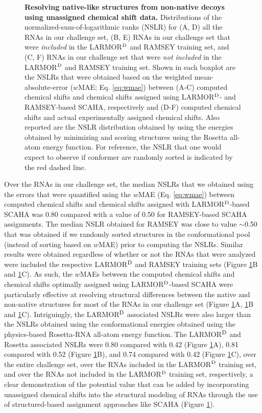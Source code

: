 \documentclass[journal=jcisd8,manuscript=article,layout=onecolumn]{achemso}
\begin{document}
{\begin{figure}[h!]
  \caption{\textbf{Resolving native-like structures from non-native decoys using unassigned chemical shift data.} Distributions of the normalized-sum-of-logarithmic ranks (NSLR) for (A, D) all the RNAs in our challenge set, (B, E) RNAs in our challenge set that were \textit{included} in the LARMOR$^{\rm D}$ and RAMSEY training set, and (C, F) RNAs in our challenge set that were \textit{not included} in the LARMOR$^{\rm D}$ and RAMSEY training set. Shown in each boxplot are the NSLRs that were obtained based on the weighted mean-absolute-error ($w$MAE; Eq. \ref{eq:wmae}) between (A-C) computed chemical shifts and chemical shifts assigned using LARMOR$^{\rm D}$- and RAMSEY-based SCAHA, respectively and (D-F) computed chemical shifts and actual experimentally assigned chemical shifts.  Also reported are the NSLR distribution obtained by using the energies obtained by minimizing and scoring structures using the Rosetta all-atom energy function\cite{alford2017rosetta}. For reference, the NSLR that one would expect to observe if conformer are randomly sorted is indicated by the red dashed line.}
  \label{fig:sensitivities}
\end{figure}

Over the RNAs in our challenge set, the median NSLRs that we obtained using the errors that were quantified using the $w$MAE (Eq. \ref{eq:wmae})  between computed chemical shifts and chemical shifts assigned with LARMOR$^{\rm D}$-based SCAHA was 0.80 compared with a value of 0.50 for RAMSEY-based SCAHA assignments. The median NSLR obtained for RAMSEY was close to value $\sim$0.50 that was obtained if we randomly sorted structures in the conformational pool (instead of sorting based on $w$MAE) prior to computing the NSLRs. Similar results were obtained regardless of whether or not the RNAs that were analyzed were included the respective LARMOR$^{\rm D}$ and RAMSEY training sets (Figure \ref{fig:sensitivities}B and \ref{fig:sensitivities}C).  As such, the $w$MAEs between the computed chemical shifts and  chemical shifts optimally assigned using LARMOR$^{\rm D}$-based SCAHA  were particularly effective at resolving structural differences between the native and non-native structures for most of the RNAs in our challenge set (Figure  \ref{fig:sensitivities}A, \ref{fig:sensitivities}B and \ref{fig:sensitivities}C). Intriguingly, the LARMOR$^{\rm D}$ associated NSLRs were also larger than the NSLRs obtained using the conformational energies obtained using the physics-based Rosetta-RNA all-atom energy function\cite{alford2017rosetta}. The LARMOR$^{\rm D}$ and Rosetta associated NSLRs were 0.80 compared with 0.42 (Figure  \ref{fig:sensitivities}A), 0.81 compared with 0.52 (Figure  \ref{fig:sensitivities}B), and 0.74 compared with 0.42 (Figure  \ref{fig:sensitivities}C), over the entire challenge set, over the RNAs included in the LARMOR$^{\rm D}$ training set, and over the RNAs not included in the LARMOR$^{\rm D}$ training set, respectively, a clear demonstration of the potential value that can be added by incorporating unassigned chemical shifts into the structural modeling of RNAs through the use of structured-based assignment approaches like SCAHA (Figure \ref{fig:sensitivities}).

}
\end{document}

